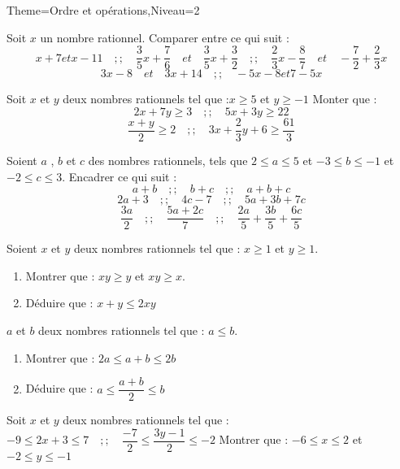 \documentclass[a4paper,12pt]{article}
\begin{document}
\begin{Maquette}[Fiche]{Theme=Ordre et opérations,Niveau=2}


\begin{exercice}
Soit $x$ un nombre rationnel. Comparer entre ce qui suit :
\[
x+7 et x-11 \quad ;; \quad
\dfrac{3}{5}x+\dfrac{7}{6} \quad et \quad \dfrac{3}{5}x+\dfrac{3}{2}\quad ;; \quad
\dfrac{2}{3}x-\dfrac{8}{7} \quad et \quad -\dfrac{7}{2}+\dfrac{2}{3}x
\]
\[
3x-8 \quad et \quad 3x+14\quad ;; \quad
-5x-8 et 7-5x
\]
\end{exercice}

\begin{exercice}
Soit $x$ et $y$ deux nombres rationnels tel que :$x\geq 5$ et $y\geq -1$\newline
Monter que :
\[
2x+7y\geq 3 \quad ;; \quad
5x+3y\geq 22
\]
\[
\dfrac{x+y}{2}\geq 2 \quad ;; \quad
3x+\dfrac{2}{3}y+6 \geq \dfrac{61}{3}
\]
\end{exercice}

\begin{exercice}
Soient $a$ , $b$ et $c$ des nombres rationnels, tels que $2\leq a \leq5$ et $-3 \leq b \leq -1$ et $-2 \leq c \leq 3$. Encadrer ce qui suit :
\[
a+b\quad ;; \quad
b+c\quad ;; \quad
a+b+c
\]
\[
2a+3\quad ;; \quad
4c-7\quad ;; \quad
5a+3b+7c
\]
\[
\dfrac{3a}{2}\quad ;; \quad
\dfrac{5a+2c}{7}\quad ;; \quad
\dfrac{2a}{5}+\dfrac{3b}{5}+\dfrac{6c}{5}
\]
\end{exercice}

\begin{exercice}
Soient $x$ et $y$ deux nombres rationnels tel que : $x\geq 1$ et $y\geq 1$.
\begin{enumerate}
\item Montrer que : $xy \geq y$ et $xy \geq x$.
\item Déduire que : $x+y \leq 2xy$
\end{enumerate}
\end{exercice}

\begin{exercice}
$a$ et $b$ deux nombres rationnels tel que : $a \leq b$.
\begin{enumerate}
\item Montrer que : $2a \leq a+b \leq 2b$
\item Déduire que : $a \leq \dfrac{a+b}{2} \leq b$
\end{enumerate}
\end{exercice}

\begin{exercice}
Soit $x$ et $y$ deux nombres rationnels tel que : 
\(
-9 \leq 2x+3 \leq 7 \quad ;; \quad \dfrac{-7}{2} \leq \dfrac{3y-1}{2} \leq -2
\)\newline
Montrer que : $-6 \leq x \leq 2$ et $-2 \leq y \leq -1$ 
\end{exercice}




\end{Maquette}
\end{document}
